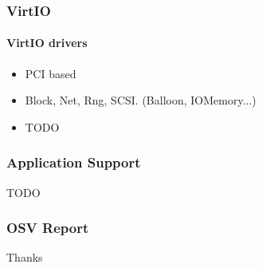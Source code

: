 \documentclass[10pt]{beamer}
\begin{document}
\begin{frame}
	\frametitle{VirtIO}
	\framesubtitle{VirtIO drivers}

	\begin{itemize}
		\item PCI based
		\item Block, Net, Rng, SCSI. (Balloon, IOMemory...)	
		\item TODO
	\end{itemize}
	
\end{frame}


\begin{frame}
	\frametitle{Application Support}
	
	\center
	TODO

\end{frame}



\begin{frame}
	\frametitle{OSV Report}

\center
Thanks

\end{frame}
\end{document}
